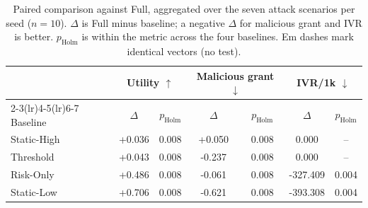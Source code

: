 \begin{table}[t]
\centering
\small
\caption{Paired comparison against Full, aggregated over the seven attack scenarios
per seed ($n=10$). $\Delta$ is Full minus baseline; a negative $\Delta$ for
malicious grant and IVR is better. $p_{\text{Holm}}$ is within the metric across
the four baselines. Em dashes mark identical vectors (no test).}
\label{tab:stats}
\begin{tabular}{lcccccc}
\toprule
 & \multicolumn{2}{c}{Utility $\uparrow$} & \multicolumn{2}{c}{Malicious grant $\downarrow$} & \multicolumn{2}{c}{IVR/1k $\downarrow$} \\
\cmidrule(lr){2-3}\cmidrule(lr){4-5}\cmidrule(lr){6-7}
Baseline & $\Delta$ & $p_{\text{Holm}}$ & $\Delta$ & $p_{\text{Holm}}$ & $\Delta$ & $p_{\text{Holm}}$ \\
\midrule
Static-High & +0.036 & 0.008 & +0.050 & 0.008 & 0.000 & -- \\
Threshold & +0.043 & 0.008 & -0.237 & 0.008 & 0.000 & -- \\
Risk-Only & +0.486 & 0.008 & -0.061 & 0.008 & -327.409 & 0.004 \\
Static-Low & +0.706 & 0.008 & -0.621 & 0.008 & -393.308 & 0.004 \\
\bottomrule
\end{tabular}
\end{table}
